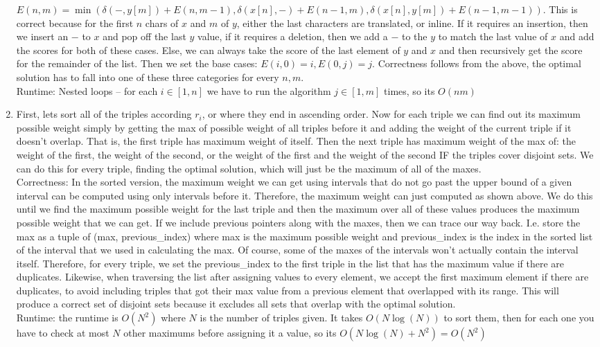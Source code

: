 \documentclass[11pt]{article}
\begin{document}
\begin{enumerate}
$E(n,m)=\min(\delta(-,y[m])+E(n,m-1),\delta(x[n],-)+E(n-1,m),\delta(x[n],y[m])+E(n-1,m-1))$. This is correct because for the first $n$ chars of $x$ and $m$ of $y$, either the last characters are translated, or inline. If it requires an insertion, then we insert an $-$ to $x$ and pop off the last $y$ value, if it requires a deletion, then we add a $-$ to the $y$ to match the last value of $x$ and add the scores for both of these cases. Else, we can always take the score of the last element of $y$ and $x$ and then recursively get the score for the remainder of the list. Then we set the base cases: $E(i,0)=i, E(0,j)=j$. Correctness follows from the above, the optimal solution has to fall into one of these three categories for every $n,m$.\\
Runtime: Nested loops -- for each $i\in[1,n]$ we have to run the algorithm $j\in[1,m]$ times, so its $O(nm)$

\newpage
\item First, lets sort all of the triples according $r_i$, or where they end in ascending order. Now for each triple we can find out its maximum possible weight simply by getting the max of possible weight of all triples before it and adding the weight of the current triple if it doesn't overlap. That is, the first triple has maximum weight of itself. Then the next triple has maximum weight of the max of: the weight of the first, the weight of the second, or the weight of the first and the weight of the second IF the triples cover disjoint sets. We can do this for every triple, finding the optimal solution, which will just be the maximum of all of the maxes. \\
Correctness: In the sorted version, the maximum weight we can get using intervals that do not go past the upper bound of a given interval can be computed using only intervals before it. Therefore, the maximum weight can just computed as shown above. We do this until we find the maximum possible weight for the last triple and then the maximum over all of these values produces the maximum possible weight that we can get. If we include previous pointers along with the maxes, then we can trace our way back. I.e. store the max as a tuple of (max, previous\_index) where max is the maximum possible weight and previous\_index is the index in the sorted list of the interval that we used in calculating the max. Of course, some of the maxes of the intervals won't actually contain the interval itself. Therefore, for every triple, we set the previous\_index to the first triple in the list that has the maximum value if there are duplicates. Likewise, when traversing the list after assigning values to every element, we accept the first maximum element if there are duplicates, to avoid including triples that got their max value from a previous element that overlapped with its range. This will produce a correct set of disjoint sets because it excludes all sets that overlap with the optimal solution.\\
Runtime: the runtime is $O(N^2)$ where $N$ is the number of triples given. It takes $O(N\log(N))$ to sort them, then for each one you have to check at most $N$ other maximums before assigning it a value, so its $O(N\log(N)+N^2)=O(N^2)$
\end{enumerate}
\end{document}
